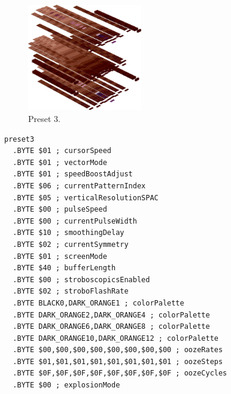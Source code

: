 \clearpage
\begin{minipage}[b]{0.48\linewidth}
\begin{figure}[H]                                                          
  \centering                                                             
  \begin{adjustbox}{width=5cm,center}                                   
  \includegraphics[width=5cm]{src/colorspace_presets/preset3-45.png}%
  \end{adjustbox}                                                        
\caption*{Preset 3.}                                           
\end{figure}                                                               
\end{minipage}
\hspace{0.1cm}
\begin{minipage}[b]{0.48\linewidth}                            
\begin{lstlisting}[basicstyle=\ttfamily\tiny]
preset3
  .BYTE $01 ; cursorSpeed
  .BYTE $01 ; vectorMode
  .BYTE $01 ; speedBoostAdjust
  .BYTE $06 ; currentPatternIndex
  .BYTE $05 ; verticalResolutionSPAC
  .BYTE $00 ; pulseSpeed
  .BYTE $00 ; currentPulseWidth
  .BYTE $10 ; smoothingDelay
  .BYTE $02 ; currentSymmetry
  .BYTE $01 ; screenMode
  .BYTE $40 ; bufferLength
  .BYTE $00 ; stroboscopicsEnabled
  .BYTE $02 ; stroboFlashRate
  .BYTE BLACK0,DARK_ORANGE1 ; colorPalette
  .BYTE DARK_ORANGE2,DARK_ORANGE4 ; colorPalette
  .BYTE DARK_ORANGE6,DARK_ORANGE8 ; colorPalette
  .BYTE DARK_ORANGE10,DARK_ORANGE12 ; colorPalette
  .BYTE $00,$00,$00,$00,$00,$00,$00,$00 ; oozeRates
  .BYTE $01,$01,$01,$01,$01,$01,$01,$01 ; oozeSteps
  .BYTE $0F,$0F,$0F,$0F,$0F,$0F,$0F,$0F ; oozeCycles
  .BYTE $00 ; explosionMode
\end{lstlisting}
\end{minipage}

\vspace*{0.3cm}

